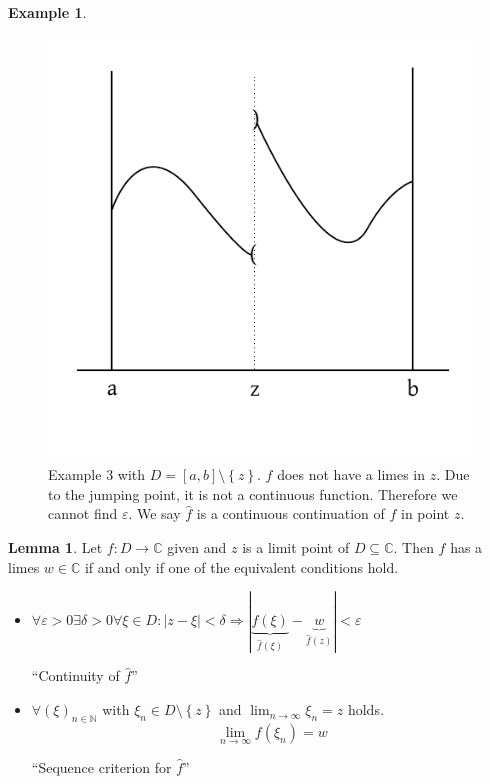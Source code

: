 \documentclass[a4paper,landscape,twocolumn]{article}
\theoremstyle{definition}
\newtheorem{ex}{Example}
\newtheorem{lemma}{Lemma}
\newcommand\set[1]{\left\{#1\right\}}
\newcommand\abs[1]{\left|#1\right|}
\newcommand\seq[1]{{\left(#1\right)}_{n \in \mathbb N}}
\begin{document}
\begin{ex}
  \begin{figure}[p]
    \begin{center}
      \includegraphics{img/continuity_example_3.pdf}
      \caption{
        Example 3 with $D = [a, b] \setminus \set{z}$.
        $f$ does not have a limes in $z$. Due to the jumping point, it is not a continuous function.
        Therefore we cannot find $\varepsilon$.
        We say $\hat{f}$ is a continuous continuation of $f$ in point $z$.
      }
      \label{img:cont-ex3}
    \end{center}
  \end{figure}
\end{ex}
\begin{lemma}
  Let $f: D \to \mathbb C$ given and $z$ is a limit point of $D \subseteq \mathbb C$.
  Then $f$ has a limes $w \in \mathbb C$ if and only if one of the equivalent conditions hold.
  \begin{itemize}
    \item
      $\forall \varepsilon > 0 \exists \delta > 0 \forall \xi \in D:
      \abs{z - \xi} < \delta
      \Rightarrow |\underbrace{f(\xi)}_{\hat{f}(\xi)} - \underbrace{w}_{\hat{f}(z)}| < \varepsilon$
      \begin{center}
        \enquote{Continuity of $\hat{f}$}
      \end{center}
    \item
      $\forall \seq{\xi}$ with $\xi_n \in D \setminus \set{z}$ and $\lim_{n\to\infty} \xi_n = z$ holds.
      \[ \lim_{n\to\infty} f(\xi_n) = w \]
      \begin{center}
        \enquote{Sequence criterion for $\hat{f}$}
      \end{center}
  \end{itemize}
\end{lemma}
\end{document}
